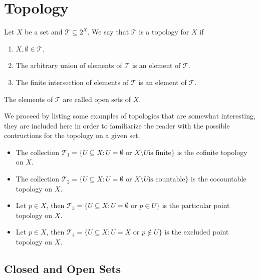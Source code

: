 \section{Topology}

\begin{definition}[Topology]
Let \(X\) be a set and \(\mathcal T \subseteq 2^X\). We say that \(\mathcal T\) is a
topology for \(X\) if
\begin{enumerate}[(T1)]\setlength\itemsep{0em}
  \item \(X, \emptyset \in \mathcal T\).
  \item The arbitrary union of elements of \(\mathcal T\) is an element of
    \(\mathcal T\).
  \item The finite intersection of elements of \(\mathcal T\) is an element of
    \(\mathcal T\).
\end{enumerate}
The elements of \(\mathcal T\) are called open sets of \(X\).
\end{definition}

\begin{example}\label{exp:some-topologies}
We proceed by listing some examples of topologies that are somewhat interesting,
they are included here in order to familiarize the reader with the possible
contructions for the topology on a given set.
\begin{itemize}\setlength\itemsep{0em}
\item The collection \(\mathcal T_1 = \{U \subseteq X : U = \emptyset \text{ or } X \setminus U \text{
is finite}\}\) is the cofinite topology on \(X\).

\item The collection \(\mathcal T_2 = \{U \subseteq X : U = \emptyset \text{ or } X \setminus U \text{
is countable}\}\) is the cocountable topology on \(X\).

\item Let \(p \in X\), then \(\mathcal T_3 = \{U \subseteq X : U = \emptyset \text{ or } p \in U\}\)
is the particular point topology on \(X\).

\item Let \(p \in X\), then \(\mathcal T_4 = \{U \subseteq X : U = X \text{ or } p \not\in
U\}\) is the excluded point topology on \(X\).
\end{itemize}
\end{example}

\subsection{Closed and Open Sets}

